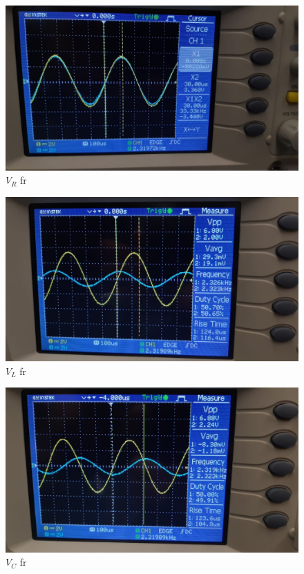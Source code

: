 \documentclass[12pt]{article}
\begin{document}
    \begin{figure}[!h]
        \centering
        \includegraphics[scale=0.2]{media/frvr.jpg}
        \caption{$V_R$ fr}
    \end{figure}
    \begin{figure}[!h]
        \centering
        \includegraphics[scale=0.2]{media/frvl.jpg}
        \caption{$V_L$ fr}
    \end{figure}
    \begin{figure}[!h]
        \centering
        \includegraphics[scale=0.2]{media/frvc.jpg}
        \caption{$V_C$ fr}
    \end{figure}
\end{document}
